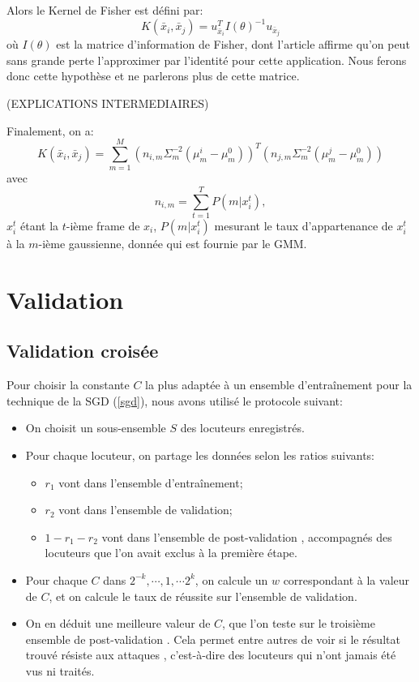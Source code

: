 \documentclass{article}
\begin{document}
Alors le Kernel de Fisher est défini par:
\[K(\bar{x}_i,\bar{x}_j) = u_{\bar{x}_i}^{T} I(\theta)^{-1} u_{\bar{x}_j}\]
où $I(\theta)$ est la matrice d'information de Fisher, dont l'article affirme qu'on peut sans grande perte l'approximer par l'identité pour cette application. Nous ferons donc cette hypothèse et ne parlerons plus de cette matrice.

(EXPLICATIONS INTERMEDIAIRES)

Finalement, on a:
\[ K(\bar{x}_i,\bar{x}_j) = \sum_{m=1}^M (n_{i,m} \Sigma_m^{-2} (\mu_m^i - \mu_m^0))^{T} (n_{j,m} \Sigma_m^{-2} (\mu_m^j - \mu_m^0)) \]
avec
\[n_{i,m} = \sum_{t=1}^{T} P(m | x_i^t),\]
$x_i^t$ étant la $t$-ième frame de $x_i$, $P(m | x_i^t)$ mesurant le taux d'appartenance de $x_i^t$ à la $m$-ième gaussienne, donnée qui est fournie par le GMM.


\section{Validation}
\label{validation}
\subsection{Validation croisée}
Pour choisir la constante $C$ la plus adaptée à un ensemble d'entraînement pour la technique de la SGD (\ref{sgd}), nous avons utilisé le protocole suivant:
\begin{itemize}
\item On choisit un sous-ensemble $S$ des locuteurs enregistrés.
\item Pour chaque locuteur, on partage les données selon les ratios suivants:
\begin{itemize}
\item $r_1$ vont dans l'ensemble d'entraînement;
\item $r_2$ vont dans l'ensemble de validation;
\item $1 - r_1 - r_2$ vont dans l'ensemble de \og post-validation \fg, accompagnés des locuteurs que l'on avait exclus à la première étape.
\end{itemize}
\item Pour chaque $C$ dans $2^{-k}, \dotsi, 1, \dotsi 2^k$, on calcule un $w$ correspondant à la valeur de $C$, et on calcule le taux de réussite sur l'ensemble de validation.
\item On en déduit une meilleure valeur de $C$, que l'on teste sur le troisième ensemble de \og post-validation \fg. Cela permet entre autres de voir si le résultat trouvé résiste aux \og attaques \fg, c'est-à-dire des locuteurs qui n'ont jamais été vus ni traités.
\end{itemize}
\end{document}
